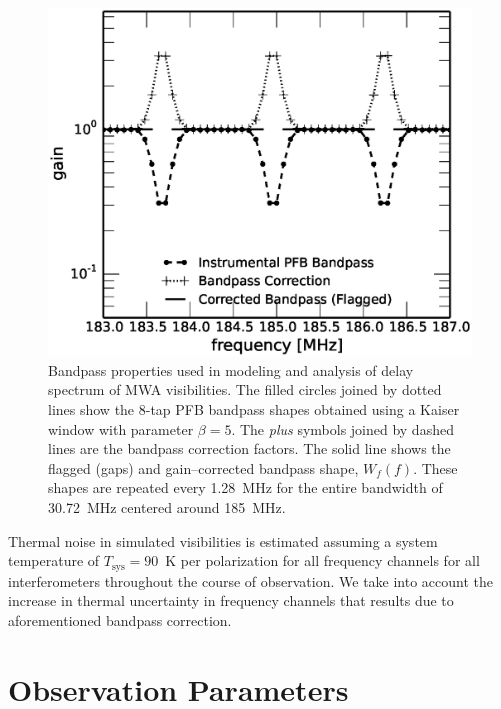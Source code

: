 \documentclass[preprint2,iop,numberedappendix]{emulateapj}
\begin{document}
\begin{figure}[htb]
\centering
\includegraphics[width=\linewidth]{figures/v1_0/bandpass_properties}
\caption{Bandpass properties used in modeling and analysis of delay spectrum of MWA visibilities. The filled circles joined by dotted lines show the 8-tap PFB bandpass shapes obtained using a Kaiser window with parameter $\beta=5$. The {\it plus} symbols joined by dashed lines are the bandpass correction factors. The solid line shows the flagged (gaps) and gain--corrected bandpass shape, $W_f(f)$. These shapes are repeated every 1.28~MHz for the entire bandwidth of 30.72~MHz centered around 185~MHz. \label{fig:bandpass}}
\end{figure}

Thermal noise in simulated visibilities is estimated assuming a system temperature of $T_\textrm{sys}=90$~K per polarization for all frequency channels for all interferometers throughout the course of observation. We take into account the increase in thermal uncertainty in frequency channels that results due to aforementioned bandpass correction. 

\section{Observation Parameters}\label{sec:obsparms}
\end{document}
